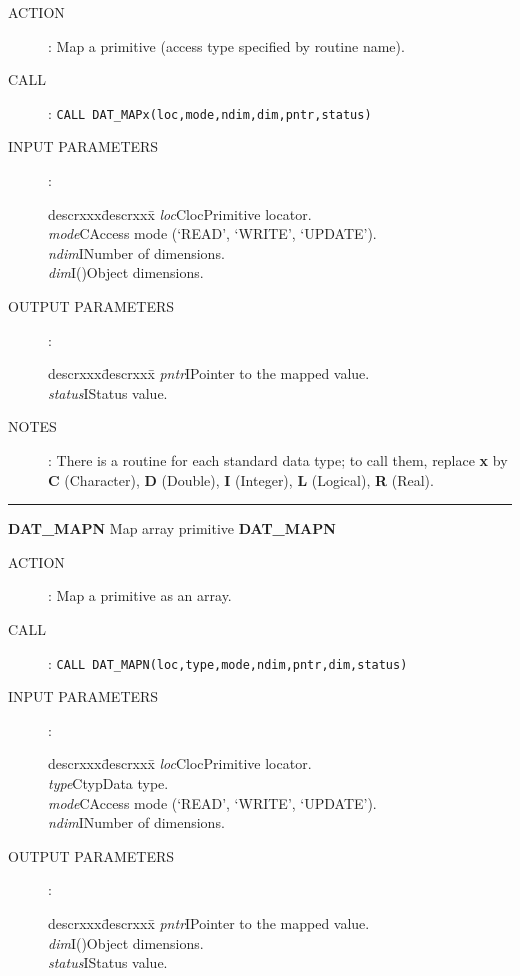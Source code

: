 \begin{description}
\item [ACTION]:
Map a primitive (access type specified by routine name).
\item [CALL]:
{\tt CALL DAT\_MAPx(loc,mode,ndim,dim,pntr,status)}
\item [INPUT PARAMETERS]:
\begin{tabbing}
descrxxx\=descrxxx\=\kill
{\em loc}\>Cloc\>Primitive locator.\\
{\em mode}\>C\>Access mode (`READ', `WRITE', `UPDATE').\\
{\em ndim}\>I\>Number of dimensions.\\
{\em dim}\>I()\>Object dimensions.
\end{tabbing}
\item [OUTPUT PARAMETERS]:
\begin{tabbing}
descrxxx\=descrxxx\=\kill
{\em pntr}\>I\>Pointer to the mapped value.\\
{\em status}\>I\>Status value.
\end{tabbing}
\item [NOTES]:
There is a routine for each standard data type; to call them, replace {\bf x}
by {\bf C} (Character), {\bf D} (Double), {\bf I} (Integer), {\bf L} (Logical),
{\bf R} (Real).
\end{description}
\goodbreak
\rule{\textwidth}{0.3mm}
{\Large {\bf DAT\_MAPN} \hfill Map array primitive \hfill {\bf DAT\_MAPN}}
\begin{description}
\item [ACTION]:
Map a primitive as an array.
\item [CALL]:
{\tt CALL DAT\_MAPN(loc,type,mode,ndim,pntr,dim,status)}
\item [INPUT PARAMETERS]:
\begin{tabbing}
descrxxx\=descrxxx\=\kill
{\em loc}\>Cloc\>Primitive locator.\\
{\em type}\>Ctyp\>Data type.\\
{\em mode}\>C\>Access mode (`READ', `WRITE', `UPDATE').\\
{\em ndim}\>I\>Number of dimensions.
\end{tabbing}
\item [OUTPUT PARAMETERS]:
\begin{tabbing}
descrxxx\=descrxxx\=\kill
{\em pntr}\>I\>Pointer to the mapped value.\\
{\em dim}\>I()\>Object dimensions.\\
{\em status}\>I\>Status value.  
\end{tabbing}
\end{description}
